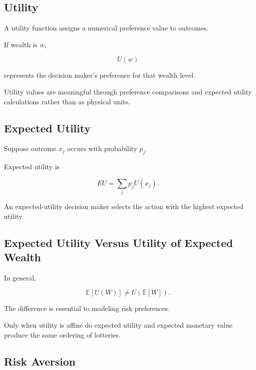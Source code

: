 \subsection{Utility}
\label{subsec:decision-utility}

A utility function assigns a numerical preference value to outcomes.

If wealth is \(w\),

\[
\boxed{
U(w)
}
\]

represents the decision maker's preference for that wealth level.

Utility values are meaningful through preference comparisons and expected
utility calculations rather than as physical units.

\subsection{Expected Utility}
\label{subsec:expected-utility}

Suppose outcome \(x_j\) occurs with probability \(p_j\).

Expected utility is

\[
\boxed{
EU
=
\sum_j
p_j
U(x_j).
}
\]

An expected-utility decision maker selects the action with the highest
expected utility.

\subsection{Expected Utility Versus Utility of Expected Wealth}
\label{subsec:expected-utility-versus-expected-wealth}

In general,

\[
\boxed{
\mathbb{E}
[
U(W)
]
\neq
U
(
\mathbb{E}[W]
).
}
\]

The difference is essential to modeling risk preferences.

Only when utility is affine do expected utility and expected monetary value
produce the same ordering of lotteries.

\subsection{Risk Aversion}
\label{subsec:risk-aversion}

